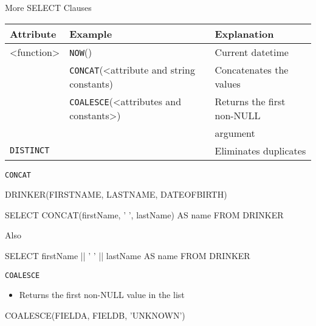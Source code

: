 \documentclass[aspectratio=169]{beamer}
\begin{document}
\begin{frame}[fragile]{More SELECT Clauses}

\begin{tabular}{|l|l|l|} \hline
\textbf{Attribute} & \textbf{Example} & \textbf{Explanation} \\ \hline
<function> & \texttt{NOW}() & Current datetime \\
& \texttt{CONCAT}(<attribute and string constants) & Concatenates the values \\
& \texttt{COALESCE}(<attributes and constants>) & Returns the first non-NULL \\
&& argument \\ \hline
\texttt{DISTINCT} & & Eliminates duplicates \\ \hline
\end{tabular}

\end{frame}


\begin{frame}[fragile]{\texttt{CONCAT}}

DRINKER(FIRSTNAME, LASTNAME, DATEOFBIRTH)

\begin{SQL}
SELECT CONCAT(firstName, ' ', lastName) AS name
FROM DRINKER
\end{SQL}

\vspace{1em}

Also

\vspace{1em}

\begin{SQL}
SELECT firstName ||  ' ' || lastName AS name
FROM DRINKER
\end{SQL}

\end{frame}
\begin{frame}[fragile]{\texttt{COALESCE}}

	
\begin{itemize}
\item Returns the first non-NULL value in the list
\end{itemize}

\begin{SQL}
COALESCE(FIELDA, FIELDB, 'UNKNOWN')
\end{SQL}

\end{frame}
\end{document}
